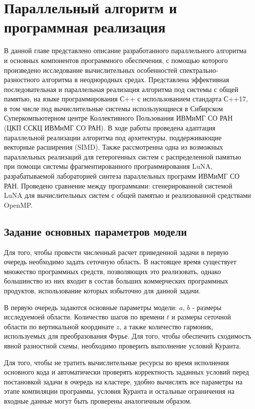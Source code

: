 \section{Параллельный алгоритм и программная реализация}

В данной главе представлено описание разработанного параллельного алгоритма и основных компонентов программного обеспечения, 
с помощью которого произведено исследование вычислительных особенностей спектрально-разностного алгоритма в неоднородных средах.
Представлена эффективная последовательная и параллельная реализация алгоритма под системы с общей памятью,
на языке программирования С++ с использованием стандарта С++17, в том числе под вычислительные системы использующиеся в Сибирском Суперкомпьютерном 
центре Коллективного Пользования ИВМиМГ СО РАН (ЦКП ССКЦ ИВМиМГ СО РАН). В ходе работы проведена  адаптация параллельной реализации алгоритма под архитектуры, поддерживающие векторные расширения (SIMD).
Также рассмотренна одна из возможных параллельных реализаций для гетерогенных систем с распределенной памятью
при помощи системы фрагментированного программирования LuNA, разрабатываемой лабораторией синтеза параллельных программ ИВМиМГ СО РАН.
Проведено сравнение между программами: сгенерированной системой LuNA для вычислительных систем с общей памятью и реализованной средствами OpenMP.

\subsection{Задание основных параметров модели}

Для того, чтобы провести численный расчет приведенной задачи в первую очередь необходимо задать сеточную область.
В настоящее время существует множество программных средств, позволяющих это реализовать,
однако большинство из них входит в состав больших коммерческих программных продуктов, 
использование которых избыточно для данной задачи.

В первую очередь задаются основные параметры модели: $a$, $b$ - размеры исследуемоей области.
Количество шагов по времени $t$ и размеры сеточной области по вертикальной координате $z$, 
а также количество гармоник, используемых для преобразования Фурье. Для того, чтобы обеспечить
сходимость явной разностной схемы, необходимо проверить выполнение условий Куранта.

Для того, чтобы не тратить вычислительные ресурсы во время исполнения основного кода и автоматически проверять корректность заданных условий перед постановкой задачи в очередь на кластере, 
удобно вычислять все параметры на этапе компиляции программы, условия Куранта и остальные ограничения на входные данные
могут быть проверены аналогичным образом.

